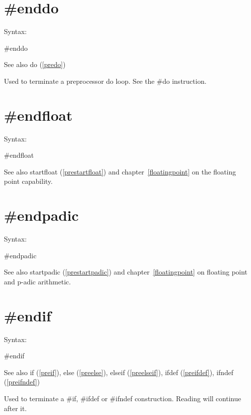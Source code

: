 
\section{\#enddo}
\label{preenddo}

\noindent Syntax:

\#enddo
 
\noindent See also do (\ref{predo})

\noindent Used to terminate a preprocessor 
do loop. See the \#do instruction.


\section{\#endfloat}
\label{preendfloat}

\noindent Syntax:

\#endfloat

\noindent See also startfloat (\ref{prestartfloat}) and chapter~\ref{floatingpoint} on the floating point capability.
 

\section{\#endpadic}
\label{preendpadic}

\noindent Syntax:

\#endpadic

\noindent See also startpadic (\ref{prestartpadic}) and chapter~\ref{floatingpoint} on floating point and p-adic arithmetic.
 

\section{\#endif}
\label{preendif}

\noindent Syntax:

\#endif
 
\noindent See also if (\ref{preif}),
            else (\ref{preelse}),
            elseif (\ref{preelseif}),
            ifdef (\ref{preifdef}),
            ifndef (\ref{preifndef})

\noindent Used to terminate a \#if, 
\#ifdef or \#ifndef construction. 
Reading will continue after it.

